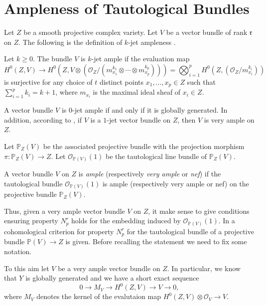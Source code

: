 \documentclass[11pt,letter]{amsart}
\newcommand\sti[1]{\todo[inline,color=magenta]{#1}}%
\numberwithin{equation}{section}
\begin{document}
\section{Ampleness of Tautological Bundles}\label{sec3}





Let $Z$ be a smooth projective complex variety. Let $V$ be a vector bundle of rank $\mathfrak{r}$ on $Z$. The following is the definition of $k$-jet ampleness \cite[\S 1.2]{BDS}.

\begin{defi}
Let $k\geq 0$. The bundle $V$ is $k$-jet ample if the evaluation map 
\[
H^0(Z,V)\rightarrow H^0(Z,V\otimes (\mathcal{O}_Z/(m_{x_1}^{k_1}\otimes \cdots\otimes m_{x_p}^{k_p})))=\bigotimes_{i=1}^pH^0(Z,(\mathcal{O}_Z/m_{x_i}^{k_i}))
\]
is surjective for any choice of $t$ distinct points $x_1,\ldots,x_p\in Z$ such that $\sum_{i=1}^pk_i=k+1$, where $m_{x_i}$ is the maximal ideal sheaf of $x_i\in Z$.
\end{defi}

A vector bundle $V$ is $0$-jet ample if and only if it is globally generated. In addition, according to \cite[Theorem 4.2]{BUP}, if $V$ is a $1$-jet vector bundle on $Z$, then $V$ is very ample on $Z$.

Let $\mathbb{P}_Z(V)$ be the associated projective bundle with the projection morphism $\pi:\mathbb{P}_Z(V)\rightarrow Z$. Let $\mathcal{O}_{\mathbb{P}(V)}(1)$ be the tautological line bundle of $\mathbb{P}_Z(V)$.


\begin{defi} 
A vector bundle $V$ on $Z$ is \emph{ample} (respectively \emph{very ample} or \emph{nef}) if the tautological bundle $\mathcal{O}_{\mathbb{P}(V)}(1)$ is ample (respectively very ample or nef) on the projective bundle $\mathbb{P}_Z(V)$. 
\end{defi}
Thus, given a very ample vector bundle $V$ on $Z$, it make sense to give conditions ensuring property $N_p^r$ holds for the embedding induced by $\mathcal{O}_{\mathbb{P}(V)}(1)$. In \cite{Park} a cohomological criterion for property $N_p^r$ for the tautological bundle of a projective bundle $\mathbb{P}(V)\rightarrow Z$ is given. Before recalling the statement we need to fix some notation.\par
To this aim let $V$ be a very ample vector bundle on $Z$. In particular, we know that $Y$ is globally generated and we have a short exact sequence
\[ 0\rightarrow M_{V}\longrightarrow H^0(Z, V)\longrightarrow V\rightarrow 0,\]
where $M_V$ denotes the kernel of the evalutaion map $H^0(Z,V)\otimes\mathcal{O}_V\rightarrow V$.
\end{document}
